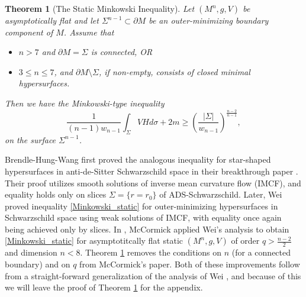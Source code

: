 \documentclass[12pt,twoside]{article}
\theoremstyle{plain}
\newtheorem{theorem}{Theorem}[section]
\theoremstyle{definition}
\theoremstyle{remark}
\numberwithin{equation}{section}
\begin{document}
\begin{theorem}[The Static Minkowski Inequality] \label{Mccormick}
Let $(M^{n},g,V)$ be asymptotically flat and let $\Sigma^{n-1} \subset \partial M$ be an outer-minimizing boundary component of $M$. Assume that

\begin{itemize}
\item $n > 7$ and $\partial M = \Sigma$ is connected, OR 
\item $3 \leq n \leq 7$, and $\partial M \setminus \Sigma$, if non-empty, consists of closed minimal hypersurfaces.
\end{itemize}
Then we have the Minkowski-type inequality  
\begin{equation} \label{Minkowski_static}
   \frac{1}{(n-1)w_{n-1}} \int_{\Sigma} VH d\sigma + 2m \geq \left( \frac{|\Sigma|}{w_{n-1}} \right)^{\frac{n-2}{n-1}},
\end{equation}
on the surface $\Sigma^{n-1}$.
\end{theorem}
Brendle-Hung-Wang first proved the analogous inequality for star-shaped hypersurfaces in anti-de-Sitter Schwarzschild space in their breakthrough paper \cite{BHW}. Their proof utilizes smooth solutions of inverse mean curvature flow (IMCF), and equality holds only on slices $\Sigma = \{ r= r_{0} \}$ of ADS-Schwarzschild. Later, Wei \cite{Wei} proved inequality \eqref{Minkowski_static} for outer-minimizing hypersurfaces in Schwarzschild space using weak solutions of IMCF, with equality once again being achieved only by slices. In \cite{Mc}, McCormick applied Wei's analysis to obtain \eqref{Minkowski_static} for asymptotitcally flat static $(M^{n},g,V)$ of order $q > \frac{n-2}{2}$ and dimension $n < 8$. Theorem \ref{Mccormick} removes the conditions on $n$ (for a connected boundary) and on $q$ from McCormick's paper. Both of these improvements follow from a straight-forward generalization of the analysis of Wei \cite{Wei}, and because of this we will leave the proof of Theorem \ref{Mccormick} for the appendix.
\end{document}
